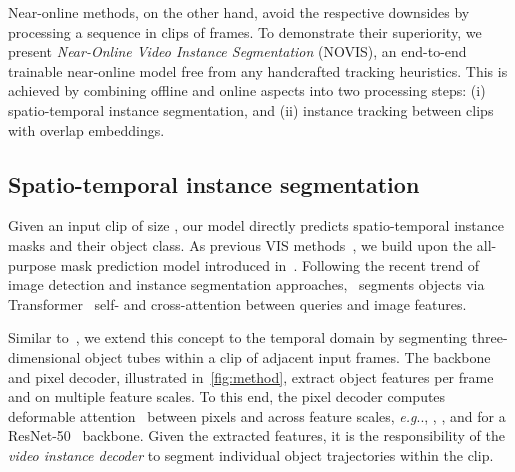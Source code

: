 \documentclass{article}
\makeatletter
\newcommand{\method}{\mbox{NOVIS}}
\theoremstyle{plain}
\theoremstyle{definition}
\theoremstyle{remark}
\DeclareRobustCommand\onedot{\futurelet\@let@token\@onedot}
\def\@onedot{\ifx\@let@token.\else.\null\fi\xspace}
\def\eg{\emph{e.g}\onedot} \def\Eg{\emph{E.g}\onedot}
\makeatother
\begin{document}
Near-online methods, on the other hand, avoid the respective downsides by processing a sequence in clips of frames.
To demonstrate their superiority, we present \emph{Near-Online Video Instance Segmentation} (\method{}), an end-to-end trainable near-online model free from any handcrafted tracking heuristics.
This is achieved by combining offline and online aspects into two processing steps: (i) spatio-temporal instance segmentation, and (ii) instance tracking between clips with overlap embeddings.




\subsection{Spatio-temporal instance segmentation}

Given an input clip of size , our model directly predicts spatio-temporal instance masks and their object class.
As previous VIS methods~\cite{huang2022minvis,heo2022vita,mask2former4vis}, we build upon the all-purpose mask prediction model introduced in~\cite{cheng2021mask2former}.
Following the recent trend of image detection and instance segmentation approaches,~\cite{cheng2021mask2former} segments objects via Transformer~\cite{attention_is_all_you_need} self- and cross-attention between queries and image features.

Similar to~\cite{mask2former4vis}, we extend this concept to the temporal domain by segmenting three-dimensional object tubes within a clip  of adjacent input frames.
The backbone and pixel decoder, illustrated in~\cref{fig:method}, extract object features per frame and on multiple feature scales.
To this end, the pixel decoder computes deformable attention~\cite{deformable_detr} between pixels and across  feature scales, \eg, , ,  and  for a ResNet-50~\cite{resnet} backbone.
Given the extracted features, it is the responsibility of the \emph{video instance decoder} to segment individual object trajectories within the clip.
\end{document}
